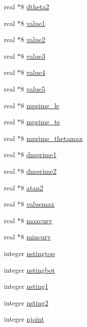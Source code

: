 \begin{DoxyCompactItemize}
real $\ast$8 \hyperlink{namespacegridvar_ad0f5aa5081590596dff14679cc98c7b4}{dtheta2}
\item 
real $\ast$8 \hyperlink{namespacegridvar_a58ea5ff8ac54ffb8b243dd41dc5f14af}{value1}
\item 
real $\ast$8 \hyperlink{namespacegridvar_a65d2fa425cf459b253a54d267df8cad0}{value2}
\item 
real $\ast$8 \hyperlink{namespacegridvar_a622406656271f2f246f84f97829821c2}{value3}
\item 
real $\ast$8 \hyperlink{namespacegridvar_a2095a361bc90411a064b20d9ae56fed1}{value4}
\item 
real $\ast$8 \hyperlink{namespacegridvar_a883f353750cac83a1357c0703986263d}{value5}
\item 
real $\ast$8 \hyperlink{namespacegridvar_a109fb1faedc36b43ce61bd38477d6e89}{mprime\+\_\+le}
\item 
real $\ast$8 \hyperlink{namespacegridvar_a5c94ce635053a47af93223354eb0df0c}{mprime\+\_\+te}
\item 
real $\ast$8 \hyperlink{namespacegridvar_aa20ece35147167b59e43c622c6bc0216}{mprime\+\_\+thetamax}
\item 
real $\ast$8 \hyperlink{namespacegridvar_a3baa2aa24a6ccc7d56e3a1fb2c053d2d}{dmprime1}
\item 
real $\ast$8 \hyperlink{namespacegridvar_a4d01dbdf0f12e4c8dda949d59470ef8a}{dmprime2}
\item 
real $\ast$8 \hyperlink{namespacegridvar_aaf7ab9a465673cc6de7235ca2790a0d8}{atan2}
\item 
real $\ast$8 \hyperlink{namespacegridvar_a03c8e52b6729ce5c1acc022a80473142}{valuemax}
\item 
real $\ast$8 \hyperlink{namespacegridvar_ae7488a3ae2a3eaff4a9e9ed253fb361e}{maxcurv}
\item 
real $\ast$8 \hyperlink{namespacegridvar_a6fe39b1ddaaf457d61c6458b903a961f}{mincurv}
\item 
integer \hyperlink{namespacegridvar_a7e34959aea544968408485c12ae2ec2d}{nstingtop}
\item 
integer \hyperlink{namespacegridvar_aa2e254a9039742bb411848f9e96a4257}{nstingbot}
\item 
integer \hyperlink{namespacegridvar_a1a9d890d3962056407f065bee6fd2739}{nsting1}
\item 
integer \hyperlink{namespacegridvar_ad662ce2bebfd96b4b3220629dbb0b5b6}{nsting2}
\item 
integer \hyperlink{namespacegridvar_ad3dfef715cafcf310b1a7c5a297d162c}{njoint}
\item 

\end{DoxyCompactItemize}
